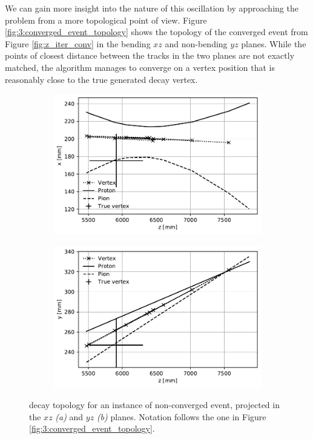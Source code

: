 We can gain more insight into the nature of this oscillation by approaching the problem from a more topological point of view.
Figure \ref{fig:3:converged_event_topology} shows the topology of the converged event from Figure \ref{fig:z_iter_conv} in the bending $xz$ and non-bending $yz$ planes.
While the points of closest distance between the tracks in the two planes are not exactly matched, the algorithm manages to converge on a vertex position that is reasonably close to the true generated decay vertex.

\begin{figure}[t]
	\centering
	\begin{subfigure}{.45\textwidth}
		\includegraphics[width=\textwidth]{graphics/03-vertex_reconstruction/evt_83_zx.pdf}
		\caption{}
		\label{fig:3:failed_zx}
	\end{subfigure}
	\begin{subfigure}{.45\textwidth}
		\includegraphics[width=\textwidth]{graphics/03-vertex_reconstruction/evt_83_zy.pdf}
		\caption{}
		\label{fig:3:failed_zy}
	\end{subfigure}
	\caption{\lambdadecay decay topology for an instance of non-converged event, projected in the $xz$ \textit{(a)} and $yz$ \textit{(b)} planes.
	Notation follows the one in Figure \ref{fig:3:converged_event_topology}.}
	\label{fig:3:failed_event_topology}
\end{figure}

